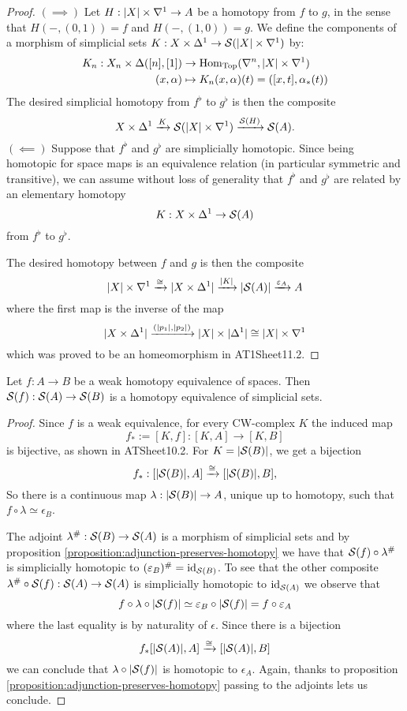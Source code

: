 \begin{proof}
$(\implies)$ Let $H:|X|\times\sx{1}\to A$ be a homotopy from $f$ to $g$, in the sense that $H(-,(0,1))=f$ and $H(-,(1,0))=g$. We define the components of a morphism of simplicial sets $K:X\times\Delta^1\to\S(|X|\times\sx{1})$ by:
\begin{align*}
    K_n:X_n\times\Delta([n],[1])&\to\Hom_\Top(\ns,|X|\times\sx{1})\\
    (x,\alpha)&\mapsto K_n(x,\alpha)(t)=([x,t],\alpha_*(t))
\end{align*}
The desired simplicial homotopy from $f^\flat$ to $g^\flat$ is then the composite
\[X\times\Delta^1\xto{K}\S(|X|\times\sx{1})\xto{\S(H)}\S(A).\]
$(\impliedby)$ Suppose that $f^\flat$ and $g^\flat$ are simplicially homotopic. Since being homotopic for space maps is an equivalence relation (in particular symmetric and transitive), we can assume without loss of generality that $f^\flat$ and $g^\flat$ are related by an elementary homotopy
\[K:X\times\Delta^1\to\S(A)\]
from $f^\flat$ to $g^\flat$.

The desired homotopy between $f$ and $g$ is then the composite
\[|X|\times\sx{1}\xto{\cong}|X\times\Delta^1|\xto{|K|}|\S(A)|\xto{\epsilon_A}A\]
where the first map is the inverse of the map
\[|X\times\Delta^1|\xto{(|p_1|,|p_2|)}|X|\times|\Delta^1|\cong|X|\times\sx{1}\]
which was proved to be an homeomorphism in AT1Sheet11.2.
\end{proof}

\begin{theorem}\label{theore:singular-complex-functor-is-homotopical}
Let $f:A\to B$ be a weak homotopy equivalence of spaces. Then $\S(f):\S(A)\to\S(B)$ is a homotopy equivalence of simplicial sets.
\end{theorem}

\begin{proof}
Since $f$ is a weak equivalence, for every CW-complex $K$ the induced map
\[f_*:=[K,f]:[K,A]\to[K,B]\]
is bijective, as shown in ATSheet10.2. For $K=|\S(B)|$, we get a bijection
\[
f_*:[|\S(B)|,A]\xto{\cong}[|\S(B)|,B],
\]
So there is a continuous map $\lambda:|\S(B)|\to A$, unique up to homotopy, such that $f\circ\lambda\simeq\epsilon_B$.

The adjoint $\lambda^\#:\S(B)\to\S(A)$ is a morphism of simplicial sets and by proposition \ref{proposition:adjunction-preserves-homotopy} we have that $\S(f)\circ\lambda^\#$ is simplicially homotopic to $(\epsilon_B)^\#=\id_{\S(B)}$. To see that the other composite $\lambda^\#\circ\S(f):\S(A)\to\S(A)$ is simplicially homotopic to $\id_{\S(A)}$ we observe that
\[f\circ\lambda\circ|\S(f)|\simeq\epsilon_B\circ|\S(f)|=f\circ\epsilon_A\]
where the last equality is by naturality of $\epsilon$. Since there is a bijection
\[f_*[|\S(A)|,A]\xto{\cong}[|\S(A)|,B]\]
we can conclude that $\lambda\circ|\S(f)|$ is homotopic to $\epsilon_A$. Again, thanks to proposition \ref{proposition:adjunction-preserves-homotopy} passing to the adjoints lets us conclude.
\end{proof}

